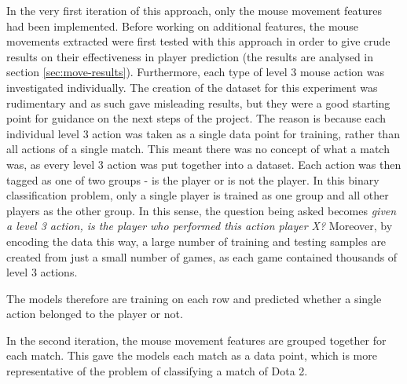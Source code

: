 \documentclass[Report.tex]{subfiles}
\begin{document}
In the very first iteration of this approach, only the mouse movement features had been implemented. Before working on additional features, the mouse movements extracted were first tested with this approach in order to give crude results on their effectiveness in player prediction (the results are analysed in section \ref{sec:move-results}). Furthermore, each type of level 3 mouse action was investigated individually. The creation of the dataset for this experiment was rudimentary and as such gave misleading results, but they were a good starting point for guidance on the next steps of the project. The reason is because each individual level 3 action was taken as a single data point for training, rather than all actions of a single match. This meant there was no concept of what a match was, as every level 3 action was put together into a dataset. Each action was then tagged as one of two groups - is the player or is not the player. In this binary classification problem, only a single player is trained as one group and all other players as the other group. In this sense, the question being asked becomes \textit{given a level 3 action, is the player who performed this action player X?} Moreover, by encoding the data this way, a large number of training and testing samples are created from just a small number of games, as each game contained thousands of level 3 actions.

The models therefore are training on each row and predicted whether a single action belonged to the player or not.

In the second iteration, the mouse movement features are grouped together for each match. This gave the models each match as a data point, which is more representative of the problem of classifying a match of Dota 2.
\end{document}

